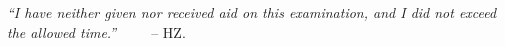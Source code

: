 \documentclass[11pt]{article}
\begin{document}
\bigbreak

\textit{“I have neither given nor received aid on this examination, and I did not exceed the allowed time.”}\ \ \ \ \ -- HZ.

%
% 
% 
\end{document}
